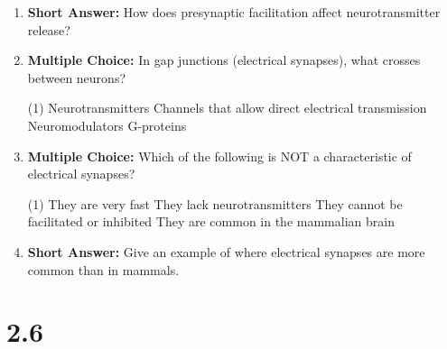 \begin{enumerate}[label=\textbf{Q2.5.\arabic*}]
      
            
      \item \textbf{Short Answer:} How does presynaptic facilitation affect neurotransmitter release? \\
            
      \item \textbf{Multiple Choice:} In gap junctions (electrical synapses), what crosses between neurons?
            \begin{tasks}[label=(\Alph*), label-width=1.5em, item-indent=1.7em](1)
                  \task Neurotransmitters
                  \task Channels that allow direct electrical transmission
                  \task Neuromodulators
                  \task G-proteins
            \end{tasks}
            
      \item \textbf{Multiple Choice:} Which of the following is NOT a characteristic of electrical synapses?
            \begin{tasks}[label=(\Alph*), label-width=1.5em, item-indent=1.7em](1)
                  \task They are very fast
                  \task They lack neurotransmitters
                  \task They cannot be facilitated or inhibited
                  \task They are common in the mammalian brain
            \end{tasks}
            
      \item \textbf{Short Answer:} Give an example of where electrical synapses are more common than in mammals. \\


\end{enumerate}
\squigglyline


\section*{2.6}

